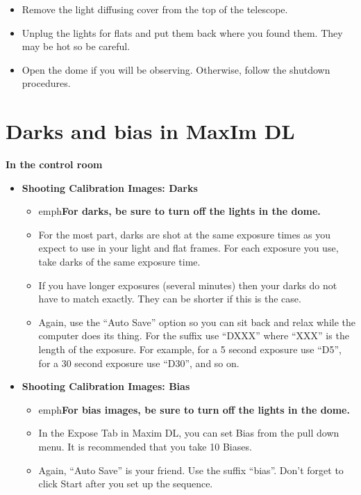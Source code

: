 \documentclass[letterpaper, 12pt]{report}
\newcommand{\location}[1]{\noindent\large{\textbf{#1}}}
\newcommand{\incontrol}{\location{In the control room}}
\begin{document}
\begin{itemize}
	\item Remove the light diffusing cover from the top of the telescope.
	\item Unplug the lights for flats and put them back where you found them. They may be hot so be careful.
	\item Open the dome if you will be observing. Otherwise, follow the shutdown procedures.
\end{itemize}

\section{Darks and bias in MaxIm DL} %
\label{sec:darks_in_maxim_dl}
\incontrol

\begin{itemize}
	\item  {\large \textbf{Shooting Calibration Images: Darks}}
	\begin{itemize}
		\item emph{\textbf{For darks, be sure to turn off the lights in the dome.}}
		\item For the most part, darks are shot at the same exposure times as you expect to use in your light and flat frames. For each exposure you use, take darks of the same exposure time.
		\item If you have longer exposures (several minutes) then your darks do not have to match exactly. They can be shorter if this is the case.
		\item Again, use the ``Auto Save'' option so you can sit back and relax while the computer does its thing. For the suffix use ``DXXX'' where ``XXX'' is the length of the exposure. For example, for a 5 second exposure use ``D5'', for a 30 second exposure use ``D30'', and so on.
	\end{itemize}
	\item {\large \textbf{Shooting Calibration Images: Bias}}
	\begin{itemize}
		\item emph{\textbf{For bias images, be sure to turn off the lights in the dome.}}
		\item In the Expose Tab in Maxim DL, you can set Bias from the pull down menu. It is recommended that you take 10 Biases.
		\item Again, ``Auto Save'' is your friend. Use the suffix ``bias''. Don't forget to click Start after you set up the sequence.
	\end{itemize}
\end{itemize}
\end{document}

